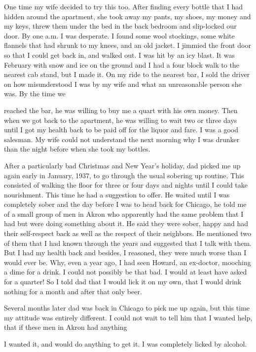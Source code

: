 One time my wife decided to try this too. After finding every bottle that I had hidden around the apartment, she took away my pants, my shoes, my money and my keys, threw them under the bed in the back bedroom and slip-locked our door. By one a.m. I was desperate. I found some wool stockings, some white flannels that had shrunk to my knees, and an old jacket. I jimmied the front door so that I could get back in, and walked out. I was hit by an icy blast. It was February with snow and ice on the ground and I had a four block walk to the nearest cab stand, but I made it. On my ride to the nearest bar, I sold the driver on how misunderstood I was by my wife and what an unreasonable person she was. By the time we

reached the bar, he was willing to buy me a quart with his own money. Then when we got back to the apartment, he was willing to wait two or three days until I got my health back to be paid off for the liquor and fare. I was a good salesman. My wife could not understand the next morning why I was drunker than the night before when she took my bottles.

After a particularly bad Christmas and New Year’s holiday, dad picked me up again early in January, 1937, to go through the usual sobering up routine. This consisted of walking the floor for three or four days and nights until I could take nourishment. This time he had a suggestion to offer. He waited until I was completely sober and the day before I was to head back for Chicago, he told me of a small group of men in Akron who apparently had the same problem that I had but were doing something about it. He said they were sober, happy and had their self-respect back as well as the respect of their neighbors. He mentioned two of them that I had known through the years and suggested that I talk with them. But I had my health back and besides, I reasoned, they were much worse than I would ever be. Why, even a year ago, I had seen Howard, an ex-doctor, mooching a dime for a drink. I could not possibly be that bad. I would at least have asked for a quarter! So I told dad that I would lick it on my own, that I would drink nothing for a month and after that only beer.

Several months later dad was back in Chicago to pick me up again, but this time my attitude was entirely different. I could not wait to tell him that I wanted help, that if these men in Akron had anything

I wanted it, and would do anything to get it. I was completely licked by alcohol.

